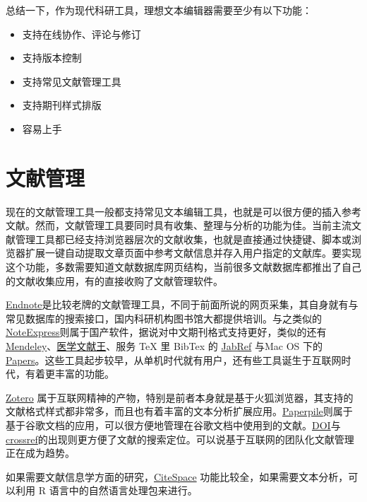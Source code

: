 \documentclass[]{tufte-book}
\providecommand{\tightlist}{%
  \setlength{\itemsep}{0pt}\setlength{\parskip}{0pt}}
\begin{document}
总结一下，作为现代科研工具，理想文本编辑器需要至少有以下功能：

\begin{itemize}
\tightlist
\item
  支持在线协作、评论与修订
\item
  支持版本控制
\item
  支持常见文献管理工具
\item
  支持期刊样式排版
\item
  容易上手
\end{itemize}

\hypertarget{ux6587ux732eux7ba1ux7406-1}{%
\section*{文献管理}\label{ux6587ux732eux7ba1ux7406-1}}

现在的文献管理工具一般都支持常见文本编辑工具，也就是可以很方便的插入参考文献。然而，文献管理工具要同时具有收集、整理与分析的功能为佳。当前主流文献管理工具都已经支持浏览器层次的文献收集，也就是直接通过快捷键、脚本或浏览器扩展一键自动提取文章页面中参考文献信息并存入用户指定的文献库。要实现这个功能，多数需要知道文献数据库网页结构，当前很多文献数据库都推出了自己的文献收集应用，有的直接收购了文献管理软件。

\href{https://endnote.com/}{Endnote}是比较老牌的文献管理工具，不同于前面所说的网页采集，其自身就有与常见数据库的搜索接口，国内科研机构图书馆大都提供培训。与之类似的\href{http://www.inoteexpress.com/aegean/}{NoteExpress}则属于国产软件，据说对中文期刊格式支持更好，类似的还有\href{https://www.mendeley.com/}{Mendeley}、\href{http://refer.medlive.cn/}{医学文献王}、服务 TeX 里 BibTex 的 \href{http://www.jabref.org/}{JabRef} 与Mac OS 下的\href{https://www.readcube.com/papers/mac}{Papers}。这些工具起步较早，从单机时代就有用户，还有些工具诞生于互联网时代，有着更丰富的功能。

\href{https://www.zotero.org/}{Zotero} 属于互联网精神的产物，特别是前者本身就是基于火狐浏览器，其支持的文献格式样式都非常多，而且也有着丰富的文本分析扩展应用。\href{https://paperpile.com/app}{Paperpile}则属于基于谷歌文档的应用，可以很方便地管理在谷歌文档中使用到的文献。\href{https://www.doi.org/}{DOI}与\href{https://www.crossref.org/}{crossref}的出现则更方便了文献的搜索定位。可以说基于互联网的团队化文献管理正在成为趋势。

如果需要文献信息学方面的研究，\href{http://cluster.cis.drexel.edu/~cchen/citespace/}{CiteSpace} 功能比较全，如果需要文本分析，可以利用 R 语言中的自然语言处理包来进行。
\end{document}
